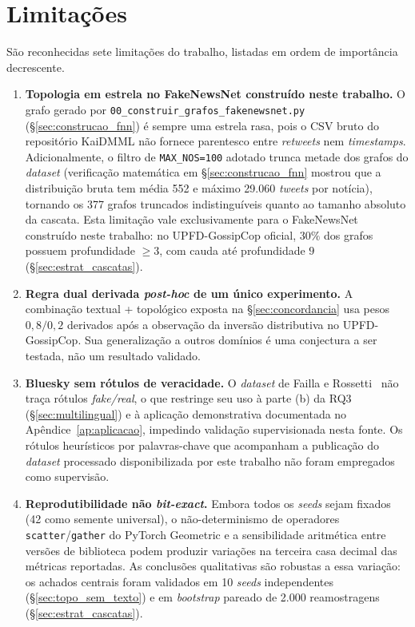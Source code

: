 \section{Limita\c{c}\~oes}
\label{sec:limitacoes}

S\~ao reconhecidas sete limita\c{c}\~oes do trabalho, listadas em ordem de
import\^ancia decrescente.

\begin{enumerate}[label=(\alph*)]
\item \textbf{Topologia em estrela no FakeNewsNet constru\'ido neste trabalho.}
O grafo gerado por \texttt{00\_construir\_grafos\_fakenewsnet.py}
(\S\ref{sec:construcao_fnn}) \'e sempre uma estrela rasa, pois o CSV
bruto do reposit\'orio KaiDMML n\~ao fornece parentesco entre
\emph{retweets} nem \emph{timestamps}. Adicionalmente, o filtro de
\texttt{MAX\_NOS=100} adotado trunca metade dos grafos do
\emph{dataset} (verifica\c{c}\~ao matem\'atica em \S\ref{sec:construcao_fnn}
mostrou que a distribui\c{c}\~ao bruta tem m\'edia 552 e m\'aximo
29.060 \emph{tweets} por not\'icia), tornando os 377 grafos truncados
indistingu\'iveis quanto ao tamanho absoluto da cascata. Esta
limita\c{c}\~ao vale exclusivamente para o FakeNewsNet constru\'ido neste trabalho:
no UPFD-GossipCop oficial, $30\%$ dos grafos possuem profundidade $\geq
3$, com cauda at\'e profundidade $9$ (\S\ref{sec:estrat_cascatas}).

\item \textbf{Regra dual derivada \emph{post-hoc} de um \'unico
experimento.} A combina\c{c}\~ao textual + topol\'ogico exposta na
\S\ref{sec:concordancia} usa pesos $0{,}8 / 0{,}2$ derivados ap\'os a
observa\c{c}\~ao da invers\~ao distributiva no UPFD-GossipCop. Sua
generaliza\c{c}\~ao a outros dom\'inios \'e uma conjectura a ser
testada, n\~ao um resultado validado.

\item \textbf{Bluesky sem r\'otulos de veracidade.} O \emph{dataset} de
Failla e Rossetti~\cite{failla2024bluesky} n\~ao tra\c{c}a r\'otulos
\emph{fake/real}, o que restringe seu uso \`a parte (b) da RQ3
(\S\ref{sec:multilingual}) e \`a aplica\c{c}\~ao demonstrativa
documentada no Ap\^endice~\ref{ap:aplicacao}, impedindo valida\c{c}\~ao
supervisionada nesta fonte. Os r\'otulos heur\'isticos por
palavras-chave que acompanham a publica\c{c}\~ao do \emph{dataset}
processado disponibilizada por este trabalho n\~ao foram empregados como supervis\~ao.

\item \textbf{Reprodutibilidade n\~ao \emph{bit-exact}.} Embora todos os
\emph{seeds} sejam fixados (42 como semente universal), o
n\~ao-determinismo de operadores \texttt{scatter}/\texttt{gather} do
PyTorch Geometric e a sensibilidade aritm\'etica entre vers\~oes de
biblioteca podem produzir varia\c{c}\~oes na terceira casa decimal das
m\'etricas reportadas. As conclus\~oes qualitativas s\~ao robustas a
essa varia\c{c}\~ao: os achados centrais foram validados em 10
\emph{seeds} independentes (\S\ref{sec:topo_sem_texto}) e em
\emph{bootstrap} pareado de 2.000 reamostragens
(\S\ref{sec:estrat_cascatas}).


\end{enumerate}
